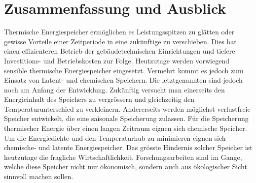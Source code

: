 \documentclass[11pt,a4paper]{scrartcl}
\begin{document}
\section{Zusammenfassung und Ausblick}
Thermische Energiespeicher ermöglichen es Leistungsspitzen zu glätten oder
gewisse Vorteile einer Zeitperiode in eine zukünftige zu verschieben. Dies hat
einen effizienteren Betrieb der gebäudetechnischen Einrichtungen und tiefere
Investitions- und Betriebskosten zur Folge. Heutzutage werden vorwiegend
sensible thermische Energiespeicher eingesetzt. Vermehrt kommt es jedoch zum
Einsatz von Latent- und chemischen Speichern. Die letztgenannten sind jedoch
noch am Anfang der Entwicklung. Zukünftig versucht man einerseits den
Energieinhalt des Speichers zu vergrössern und gleichzeitig den
Temperaturunterschied zu verkleinern. Andererseits werden möglichst verlustfreie
Speicher entwickelt, die eine saisonale Speicherung zulassen. Für die
Speicherung thermischer Energie über einen langen Zeitraum eignen sich chemische
Speicher. Um die Energiedichte und den Temperaturhub zu minimieren eignen sich
chemische- und latente Energiespeicher. Das grösste Hindernis solcher Speicher
ist heutzutage die fragliche Wirtschaftlichkeit. Forschungsarbeiten sind im
Gange, welche diese Speicher nicht nur ökonomisch, sondern auch aus ökologischer
Sicht sinnvoll machen sollen.
\newpage
\listoftables
\newpage
\listoffigures
\newpage
\end{document}
